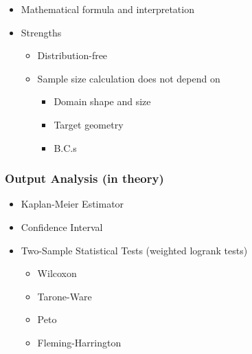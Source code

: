       \begin{itemize}
        \item Mathematical formula and interpretation
        \item Strengths
          \begin{itemize}
            \item Distribution-free
            \item Sample size calculation does not depend on 
              \begin{itemize}
                \item Domain shape and size
                \item Target geometry
                \item B.C.s
              \end{itemize}
          \end{itemize}
      \end{itemize}



      \subsubsection{Output Analysis (in theory)}

        \begin{itemize}
          \item Kaplan-Meier Estimator \cite{kaplan1958nonparametric} \cite{aalen2008survival}
          \item Confidence Interval \cite{greenwoodnatural} \cite{hosmer2011applied} \cite{kalbfleisch2011statistical}\cite{sawyer2003greenwood}
          \item Two-Sample Statistical Tests (weighted logrank tests) \cite{custodio2007diagnostics} \cite{agarwal2012statistics} \cite{karadeniz2017examining} \cite{leton2001equivalence} \cite{etikan2017kaplan} \cite{harrington1982class}
            \begin{itemize}
              \item Wilcoxon
              \item Tarone-Ware
              \item Peto
              \item Fleming-Harrington
            \end{itemize}
            
        \end{itemize}
      
      
    
      
